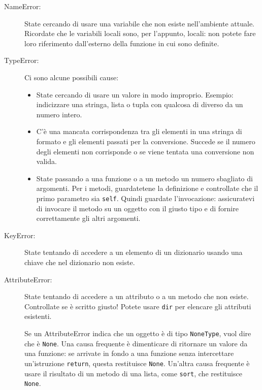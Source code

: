 \documentclass[10pt]{book}
\begin{document}
\begin{description}

\item[NameError:]  State cercando di usare una variabile che non esiste nell'ambiente attuale. Ricordate che le variabili locali sono, per l'appunto, locali: non potete fare loro riferimento dall'esterno della funzione in cui sono definite.

\item[TypeError:] Ci sono alcune possibili cause:

\begin{itemize}

\item  State cercando di usare un valore in modo improprio. Esempio: indicizzare una stringa, lista o tupla con qualcosa di diverso da un numero intero. 

\item C'è una mancata corrispondenza tra gli elementi in una stringa di formato e gli elementi passati per la conversione. Succede se il numero degli elementi non corrisponde o se viene tentata una conversione non valida.

\item State passando a una funzione o a un metodo un numero sbagliato di argomenti. Per i metodi, guardatetene la definizione e controllate che il primo parametro sia {\tt self}.  Quindi guardate l'invocazione: assicuratevi di invocare il metodo su un oggetto con il giusto tipo e di fornire correttamente gli altri argomenti.

\end{itemize}

\item[KeyError:]  State tentando di accedere a un elemento di un dizionario usando una chiave che nel dizionario non esiste.

\item[AttributeError:] State tentando di accedere a un attributo o a un metodo che non esiste. Controllate se è scritto giusto! Potete usare
{\tt dir} per elencare gli attributi esistenti.

Se un AttributeError indica che un oggetto è di tipo {\tt NoneType},
vuol dire che è {\tt None}.  Una causa frequente è dimenticare di ritornare un valore da una funzione: se arrivate in fondo a una funzione senza intercettare un'istruzione {\tt return}, questa restituisce {\tt None}.  Un'altra causa frequente è usare il risultato di un metodo di una lista, come {\tt sort}, che restituisce {\tt None}.


\end{description}
\end{document}
